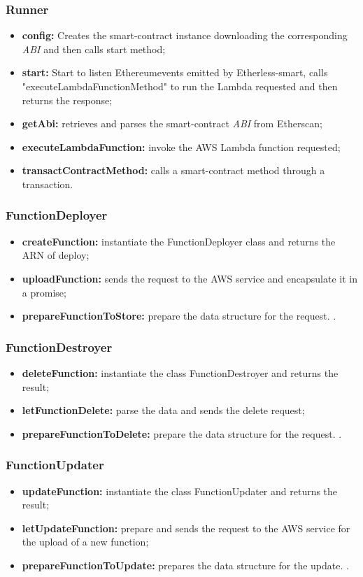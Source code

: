 \subsubsection{Runner}
\begin{itemize}
	\item \textbf{config:} Creates the smart-contract instance downloading the corresponding \textit{ABI\glo} and then calls start method;
	\item \textbf{start:} Start to listen Ethereum\glo events emitted by Etherless-smart, calls "executeLambdaFunctionMethod" to run the Lambda requested and then returns the response;
	\item \textbf{getAbi:} retrieves and parses the smart-contract \textit{ABI\glo} from Etherscan;
	\item \textbf{executeLambdaFunction:} invoke the AWS Lambda function requested;
	\item \textbf{transactContractMethod:} calls a smart-contract method through a transaction.
\end{itemize}
\subsubsection{FunctionDeployer}
\begin{itemize}
	\item \textbf{createFunction:} instantiate the FunctionDeployer class and returns the ARN of deploy;
	\item \textbf{uploadFunction:}  sends the request to the AWS service and encapsulate it in a promise;
	\item \textbf{prepareFunctionToStore:} prepare the data structure for the request.        .
\end{itemize}
\subsubsection{FunctionDestroyer}
\begin{itemize}
	\item \textbf{deleteFunction:} instantiate the class FunctionDestroyer and returns the result;
	\item \textbf{letFunctionDelete:}  parse the data and sends the delete request;
	\item \textbf{prepareFunctionToDelete:} prepare the data structure for the request.        .
\end{itemize}
\subsubsection{FunctionUpdater}
\begin{itemize}
	\item \textbf{updateFunction:} instantiate the class FunctionUpdater and returns the result;
	\item \textbf{letUpdateFunction:}  prepare and sends the request to the AWS service for the upload of a new function;
	\item \textbf{prepareFunctionToUpdate:} prepares the data structure for the update.        .
\end{itemize}
